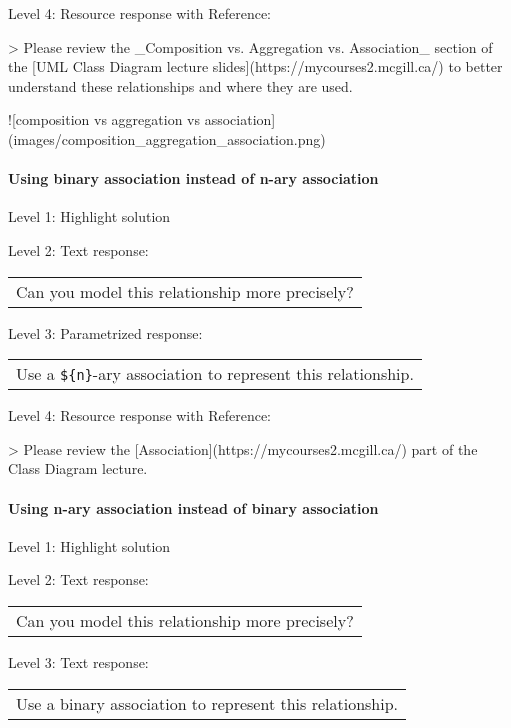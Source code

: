 \noindent Level 4: Resource response with Reference:

> Please review the _Composition vs. Aggregation vs. Association_ section of 
the [UML Class Diagram lecture slides](https://mycourses2.mcgill.ca/) to 
better understand these relationships and where they are used.

![composition vs aggregation vs association](images/composition_aggregation_association.png)


\paragraph{Using binary association instead of n-ary association}

\noindent Level 1: Highlight solution \medskip

\noindent Level 2: Text response: \medskip

\begin{tabular}{|c}
Can you model this relationship more precisely?
\end{tabular} \medskip

\noindent Level 3: Parametrized response: \medskip

\begin{tabular}{|c}
Use a \verb|${n}|-ary association to represent this relationship.
\end{tabular} \medskip

\noindent Level 4: Resource response with Reference:

> Please review the [Association](https://mycourses2.mcgill.ca/) part of the Class Diagram lecture.


\paragraph{Using n-ary association instead of binary association}

\noindent Level 1: Highlight solution \medskip

\noindent Level 2: Text response: \medskip

\begin{tabular}{|c}
Can you model this relationship more precisely?
\end{tabular} \medskip

\noindent Level 3: Text response: \medskip

\begin{tabular}{|c}
Use a binary association to represent this relationship.
\end{tabular} \medskip

